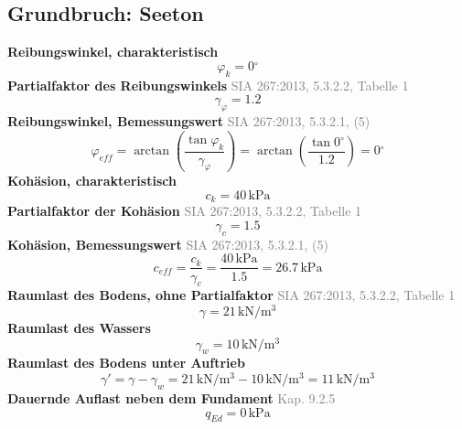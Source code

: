 \documentclass[11pt,a4paper]{article}
\newcommand{\normref}[1]{{\small\textcolor{gray}{#1}}}
\begin{document}
\subsection{Grundbruch: Seeton}
\noindent\textbf{Reibungswinkel, charakteristisch}
\begin{equation*}
\varphi_k = 0{}^{\circ}
\end{equation*}
\noindent\textbf{Partialfaktor des Reibungswinkels} \hfill \normref{SIA 267:2013, 5.3.2.2, Tabelle 1}
\begin{equation*}
\gamma_{\varphi} = 1.2
\end{equation*}
\noindent\textbf{Reibungswinkel, Bemessungswert} \hfill \normref{SIA 267:2013, 5.3.2.1, (5)}
\begin{equation*}
\varphi_{eff} = \arctan\left(\frac{\tan \varphi_k}{\gamma_{\varphi}}\right) = \arctan\left(\frac{\tan 0{}^{\circ}}{1.2}\right) = 0{}^{\circ}
\end{equation*}
\noindent\textbf{Kohäsion, charakteristisch}
\begin{equation*}
c_k = 40\,\mathrm{kPa}
\end{equation*}
\noindent\textbf{Partialfaktor der Kohäsion} \hfill \normref{SIA 267:2013, 5.3.2.2, Tabelle 1}
\begin{equation*}
\gamma_c = 1.5
\end{equation*}
\noindent\textbf{Kohäsion, Bemessungswert} \hfill \normref{SIA 267:2013, 5.3.2.1, (5)}
\begin{equation*}
c_{eff} = \frac{c_k}{\gamma_c} = \frac{40\,\mathrm{kPa}}{1.5} = 26.7\,\mathrm{kPa}
\end{equation*}
\noindent\textbf{Raumlast des Bodens, ohne Partialfaktor} \hfill \normref{SIA 267:2013, 5.3.2.2, Tabelle 1}
\begin{equation*}
\gamma = 21\,\mathrm{kN}/\mathrm{m}^{3}
\end{equation*}
\noindent\textbf{Raumlast des Wassers}
\begin{equation*}
\gamma_w = 10\,\mathrm{kN}/\mathrm{m}^{3}
\end{equation*}
\noindent\textbf{Raumlast des Bodens unter Auftrieb}
\begin{equation*}
\gamma' = \gamma - \gamma_w = 21\,\mathrm{kN}/\mathrm{m}^{3} - 10\,\mathrm{kN}/\mathrm{m}^{3} = 11\,\mathrm{kN}/\mathrm{m}^{3}
\end{equation*}
\noindent\textbf{Dauernde Auflast neben dem Fundament} \hfill \normref{Kap. 9.2.5}
\begin{equation*}
q_{Ed} = 0\,\mathrm{kPa}
\end{equation*}
\end{document}
